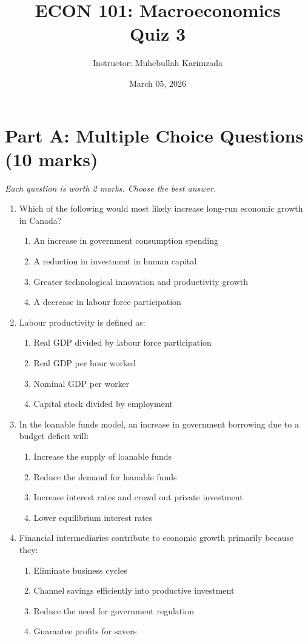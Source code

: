 \documentclass[12pt]{article}
\title{ECON 101: Macroeconomics \\ Quiz 3}
\author{Instructor: Muhebullah Karimzada}
\date{March 05,  2026}
\begin{document}
\maketitle


\section*{Part A: Multiple Choice Questions (10 marks)}

\textit{Each question is worth 2 marks. Choose the best answer.}

\begin{enumerate}[label=\textbf{\arabic*.}]

\item Which of the following would most likely increase long-run economic growth in Canada?
\begin{enumerate}[label=(\Alph*)]
\item An increase in government consumption spending  
\item A reduction in investment in human capital  
\item Greater technological innovation and productivity growth  
\item A decrease in labour force participation  
\end{enumerate}

\item Labour productivity is defined as:
\begin{enumerate}[label=(\Alph*)]
\item Real GDP divided by labour force participation  
\item Real GDP per hour worked  
\item Nominal GDP per worker  
\item Capital stock divided by employment  
\end{enumerate}

\item In the loanable funds model, an increase in government borrowing due to a budget deficit will:
\begin{enumerate}[label=(\Alph*)]
\item Increase the supply of loanable funds  
\item Reduce the demand for loanable funds  
\item Increase interest rates and crowd out private investment  
\item Lower equilibrium interest rates  
\end{enumerate}
\newpage
\item Financial intermediaries contribute to economic growth primarily because they:
\begin{enumerate}[label=(\Alph*)]
\item Eliminate business cycles  
\item Channel savings efficiently into productive investment  
\item Reduce the need for government regulation  
\item Guarantee profits for savers  
\end{enumerate}


\end{enumerate}
\end{document}
